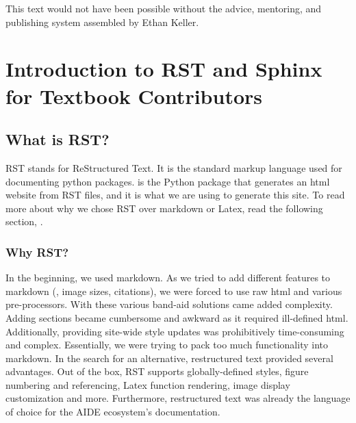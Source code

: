 \documentclass[letterpaper,10pt,english]{sphinxmanual}
\begin{document}
This text would not have been possible without the advice, mentoring, and publishing system assembled by Ethan Keller.


\chapter{Introduction to RST and Sphinx for Textbook Contributors}
\label{\detokenize{Textbook_Creation_Help/rst_intro:introduction-to-rst-and-sphinx-for-textbook-contributors}}\label{\detokenize{Textbook_Creation_Help/rst_intro:title-rst-intro}}\label{\detokenize{Textbook_Creation_Help/rst_intro::doc}}

\section{What is RST?}
\label{\detokenize{Textbook_Creation_Help/rst_intro:what-is-rst}}\label{\detokenize{Textbook_Creation_Help/rst_intro:heading-what-is-rst}}
RST stands for ReStructured Text. It is the standard markup language used for documenting python packages.  is the Python package that generates an html website from RST files, and it is what we are using to generate this site. To read more about why we chose RST over markdown or Latex, read the following section, {\hyperref[\detokenize{Textbook_Creation_Help/rst_intro:heading-why-rst}]{}}.


\subsection{Why RST?}
\label{\detokenize{Textbook_Creation_Help/rst_intro:why-rst}}\label{\detokenize{Textbook_Creation_Help/rst_intro:heading-why-rst}}
In the beginning, we used markdown. As we tried to add different features to markdown (, image sizes, citations), we were forced to use raw html and various pre-processors. With these various band-aid solutions came added complexity. Adding sections became cumbersome and awkward as it required ill-defined html. Additionally, providing site-wide style updates was prohibitively time-consuming and complex. Essentially, we were trying to pack too much functionality into markdown. In the search for an alternative, restructured text provided several advantages. Out of the box, RST supports globally-defined styles, figure numbering and referencing, Latex function rendering, image display customization and more. Furthermore, restructured text was already the language of choice for the AIDE ecosystem’s documentation.
\end{document}
